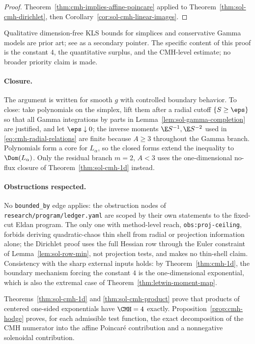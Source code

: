 \documentclass[../main.tex]{subfiles}
\begin{document}
\begin{proof}
Theorem~\ref{thm:cmh-implies-affine-poincare} applied to
Theorem~\ref{thm:sol-cmh-dirichlet}, then Corollary~\ref{cor:sol-cmh-linear-images}.
\end{proof}

Qualitative dimension-free KLS bounds for simplices and conservative Gamma models are prior
art; see \cite[\S1.2]{KolesnikovMilman2016OrliczKLS} as a secondary pointer. The specific
content of this proof is the constant $4$, the quantitative surplus, and the CMH-level estimate;
no broader priority claim is made.

\paragraph{Closure.}
The argument is written for smooth $g$ with controlled boundary behavior. To close: take
polynomials on the simplex, lift them after a radial cutoff $\{S\ge\eps\}$ so that all Gamma
integrations by parts in Lemma~\ref{lem:sol-gamma-completion} are justified, and let
$\eps\downarrow0$; the inverse moments $\E S^{-1},\E S^{-2}$ used in
\eqref{eq:cmh-radial-relations} are finite because $A\ge3$ throughout the Gamma branch.
Polynomials form a core for $L_\alpha$, so the closed forms extend the inequality to
$\Dom(L_\alpha)$. Only the residual branch $m=2$, $A<3$ uses the one-dimensional no-flux closure
of Theorem~\ref{thm:sol-cmh-1d} instead.

\paragraph{Obstructions respected.}
No \texttt{bounded\_by} edge applies: the obstruction nodes of
\texttt{research/program/ledger.yaml} are scoped by their own statements to the fixed-cut
Eldan program. The only one with method-level reach,
\texttt{obs:proj-ceiling}, forbids deriving quadratic-chaos thin shell from radial or projection
information alone; the Dirichlet proof uses the full Hessian row through the Euler constraint of
Lemma~\ref{lem:sol-row-min}, not projection tests, and makes no thin-shell claim.
Consistency with the sharp external inputs holds: by Theorem~\ref{thm:cmh-1d}, the boundary
mechanism forcing the constant $4$ is the one-dimensional exponential, which is also the
extremal case of Theorem~\ref{thm:letwin-moment-map}.

\begin{corollary}[= Corollary~\ref{rem:cmh-saturation-risk}]
\label{rem:sol-cmh-saturation-risk}
Theorems~\ref{thm:sol-cmh-1d} and \ref{thm:sol-cmh-product} prove that products of centered
one-sided exponentials have $\CMH=4$ exactly. Proposition~\ref{prop:cmh-hodge} proves, for each
admissible test function, the exact decomposition of the CMH numerator into the affine
Poincar\'e contribution and a nonnegative solenoidal contribution.
\end{corollary}
\end{document}
